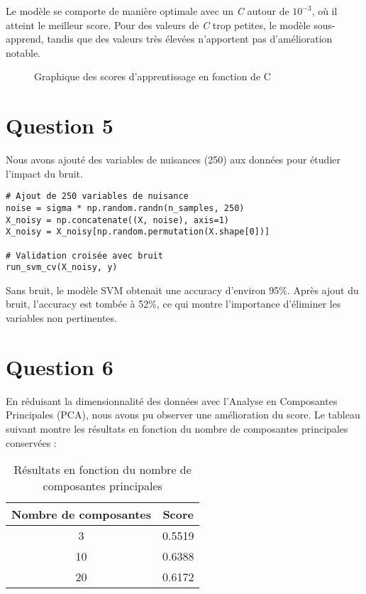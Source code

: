 \documentclass[a4paper,12pt]{article}
\begin{document}
Le modèle se comporte de manière optimale avec un \textit{C} autour de $10^{-3}$, où il atteint le meilleur score. Pour des valeurs de \textit{C} trop petites, le modèle sous-apprend, tandis que des valeurs très élevées n'apportent pas d'amélioration notable.

\begin{figure}[H]
\centering

\caption{Graphique des scores d'apprentissage en fonction de C}
\end{figure}

\section*{Question 5}

Nous avons ajouté des variables de nuisances (250) aux données pour étudier l'impact du bruit.

\begin{verbatim}
# Ajout de 250 variables de nuisance
noise = sigma * np.random.randn(n_samples, 250)
X_noisy = np.concatenate((X, noise), axis=1)
X_noisy = X_noisy[np.random.permutation(X.shape[0])]

# Validation croisée avec bruit
run_svm_cv(X_noisy, y)
\end{verbatim}

Sans bruit, le modèle SVM obtenait une accuracy d'environ 95\%. Après ajout du bruit, l'accuracy est tombée à 52\%, ce qui montre l'importance d'éliminer les variables non pertinentes.

\section*{Question 6}

En réduisant la dimensionnalité des données avec l'Analyse en Composantes Principales (PCA), nous avons pu observer une amélioration du score. Le tableau suivant montre les résultats en fonction du nombre de composantes principales conservées :

\begin{table}[H]
\centering
\begin{tabular}{|c|c|}
\hline
Nombre de composantes & Score  \\
\hline
3 & 0.5519 \\
10 & 0.6388 \\
20 & 0.6172 \\
\hline
\end{tabular}
\caption{Résultats en fonction du nombre de composantes principales}
\end{table}
\end{document}
